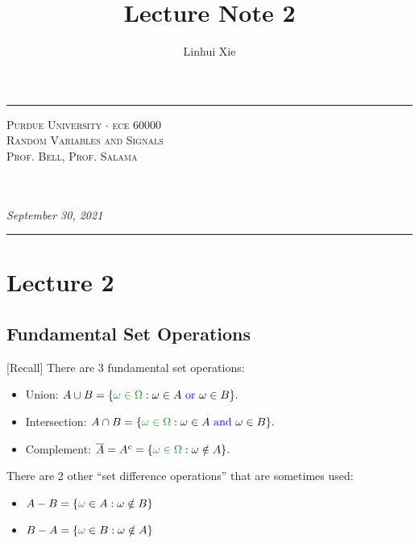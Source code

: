\documentclass[12pt,thmsa]{article}
\author{Linhui Xie}
\title{Lecture Note 2}
\makeatletter
\def\maketitle{%
	\par
	\hrule height 1.5pt\vspace{1ex}
	\par\noindent
	
	\begin{minipage}{0.5\textwidth}
		\scshape
		Purdue University $\cdot$ ece 60000 \\[1ex]
		Random Variables and Signals \\
		Prof. Bell, Prof. Salama
	\end{minipage}
	\begin{minipage}{0.45\textwidth}
		\raggedleft
		\MakeTextUppercase{{\@title}}\\[0.3ex] %
		\textit{\@author}\\[0.2ex]
		\textit{September 30, 2021}
	\end{minipage}
	\par\vspace{1ex}
	\hrule height 1.5pt\vspace{1ex}
	\par
}
\makeatother
\begin{document}
\maketitle

\setcounter{section}{1}
\section{Lecture 2\medskip}

\setcounter{section}{2}
\subsection{Fundamental Set Operations}  %

[Recall] There are 3 fundamental set operations:
\begin{itemize}
	\item Union: \(
	A \cup B =\{ {\color{forestgreen}{\omega \in \Omega}}: \omega \in A {\color{blue}{\text { or }}} \omega \in B\}.
	\)
	\item Intersection: \(
	A \cap B=\{ {\color{forestgreen}{\omega \in \Omega}}: \omega \in A {\color{blue}{\text { and }}} \omega \in B\}.
	\)
	\item Complement: \(
	\overline{A}=A^c=\{ {\color{forestgreen}{\omega \in \Omega}}: \omega \notin  A\}.
	\)
\end{itemize}

\noindent
There are 2 other ``set difference operations'' that are sometimes used:
\begin{itemize}
	\item \(A - B = \{{\color{forestgreen}{\omega}} \in A: \omega \notin B\} \)
	\item \(B - A = \{{\color{forestgreen}{\omega}} \in B: \omega \notin A\} \)
\end{itemize}

\end{document}
